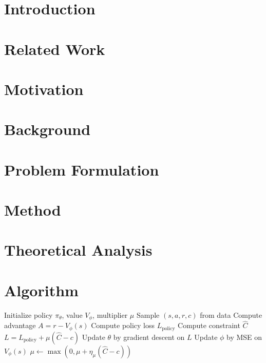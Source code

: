 
\section{Introduction}
\label{sec:intro}

\section{Related Work}
\label{sec:related}

\section{Motivation}
\label{sec:motivation}

\section{Background}
\label{sec:background}

\section{Problem Formulation}
\label{sec:problem}

\section{Method}
\label{sec:method}

\section{Theoretical Analysis}
\label{sec:theory}

\section{Algorithm}
\label{sec:algorithm}
\begin{algorithm}[H]
\caption{Lagrangian-Constrained Policy Optimization}
\begin{algorithmic}[1]
\STATE Initialize policy $\pi_\theta$, value $V_\phi$, multiplier $\mu$
    \STATE Sample $(s, a, r, c)$ from data
    \STATE Compute advantage $A = r - V_\phi(s)$
    \STATE Compute policy loss $L_{\text{policy}}$
    \STATE Compute constraint $\hat{C}$
    \STATE $L = L_{\text{policy}} + \mu (\hat{C} - c)$
    \STATE Update $\theta$ by gradient descent on $L$
    \STATE Update $\phi$ by MSE on $V_\phi(s)$
    \STATE $\mu \leftarrow \max(0, \mu + \eta_\mu (\hat{C} - c))$
  \ENDFOR
\ENDFOR
\end{algorithmic}
\end{algorithm}


